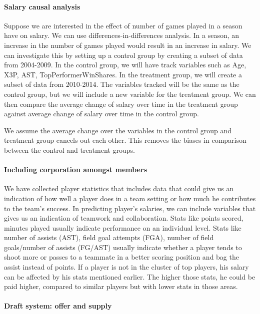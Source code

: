 \paragraph{Salary causal analysis}Suppose we are interested in the effect of number of games played in a season have on salary. We can use differences-in-differences analysis. In a season, an increase in the number of games played would result in an increase in salary. We can investigate this by setting up a control group by creating a subset of data from 2004-2009. In the control group, we will have track variables such as Age, X3P, AST, TopPerformerWinShares. In the treatment group, we will create a subset of data from 2010-2014. The variables tracked will be the same as the control group, but we will include a new variable for the treatment group. We can then compare the average change of salary over time in the treatment group against average change of salary over time in the control group.

We assume the average change over the variables in the control group and treatment group cancels out each other. This removes the biases in comparison between the control and treatment groups.

\paragraph{Including corporation amongst members}We have collected player statistics that includes data that could give us an indication of how well a player does in a team setting or how much he contributes to the team’s success. In predicting player’s salaries, we can include variables that gives us an indication of teamwork and collaboration. Stats like points scored, minutes played usually indicate performance on an individual level.  Stats like number of assists (AST), field goal attempts (FGA), number of field goals/number of assists (FG/AST) usually indicate whether a player tends to shoot more or passes to a teammate in a better scoring position and bag the assist instead of points. If a player is not in the cluster of top players, his salary can be affected by his stats mentioned earlier. The higher those stats, he could be paid higher, compared to similar players but with lower stats in those areas.

\paragraph{Draft system: offer and supply}

